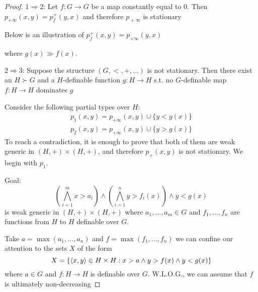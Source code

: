 \documentclass[11pt]{article}
\begin{document}
\begin{proof}
\(1\Rightarrow 2\): Let \(f:G\to G\) be a map constantly equal to 0. Then \(p_{+\infty}(x,y)=p_f^+(y,x)\) and
therefore \(p_{​+\infty}\) is stationary \label{Problem4}

Below is an illustration of \(p_f^+(x,y)=p_{+\infty}(y,x)\)
\begin{center}
\end{center}
where \(g(x)\gg f(x)\).

\(2\Rightarrow 3\): Suppose the structure \((G,<,+,\dots)\) is not stationary. Then there exist an \(H\succ G\)
and a \(H\)-definable function \(g:H\to H\) s.t. no \(G\)-definable map \(f:H\to H\) dominates \(g\)

Consider the following partial types over \(H\):
\begin{gather*}
p_1(x,y)=p_{+\infty}(x,y)\cup\{y<g(x)\}\\
p_2(x,y)=p_{+\infty}(x,y)\cup\{y>g(x)\}
\end{gather*}
To reach a contradiction, it is enough to prove that both of them are weak generic
in \((H,+)\times(H,+)\), and therefore \(p_+(x,y)\) is not stationary. We begin with \(p_1\).

Goal:
\begin{equation*}
(\bigwedge_{i=1}^mx>a_i)\wedge(\bigwedge_{i=1}^ny>f_i(x))\wedge y<g(x)
\end{equation*}
is weak generic in \((H,+)\times(H,+)\) where \(a_1,\dots,a_m\in G\) and \(f_1,\dots,f_n\) are functions
from \(H\) to \(H\) definable over \(G\).

Take \(a=\max(a_1,\dots,a_n)\) and \(f=\max(f_1,\dots,f_n)\) we can confine our attention to the
sets \(X\) of the form
\begin{equation*}
X=\{\langle x,y\rangle\in H\times H:x>a\wedge y>f(x)\wedge y<g(x)\}
\end{equation*}
where \(a\in G\) and \(f:H\to H\) is definable over \(G\). W.L.O.G., we can assume that \(f\) is
ultimately non-decreasing


\end{proof}
\end{document}
